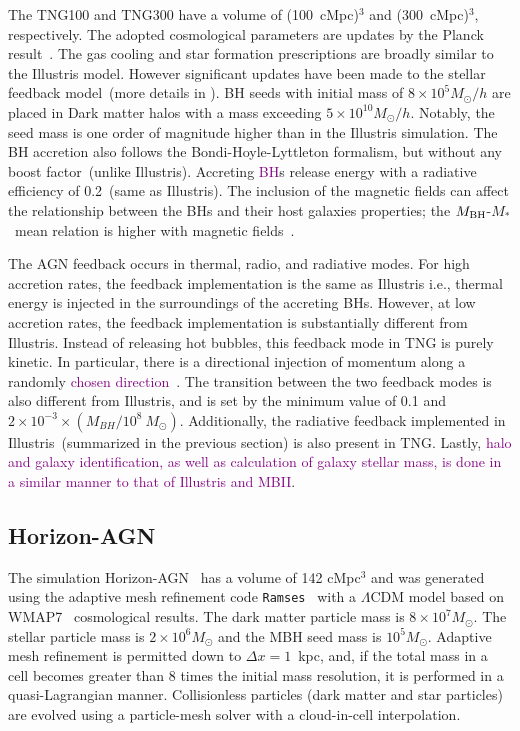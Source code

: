 \documentclass[twocolumn]{aastex631}
\newcommand{\red}[1]{\textcolor{purple}{#1}}
\def\smass{{$M_*$}}
\def\mbh{$M_{\rm BH}$}
\begin{document}
The TNG100 and TNG300 have a volume of (100~cMpc)$^3$ and (300~cMpc)$^3$, respectively. The adopted cosmological parameters are updates by the Planck result~\citep{2016A&A...594A..13P}.
The gas cooling and star formation prescriptions are broadly similar to the Illustris model. However significant updates have been made to the stellar feedback model~(more details in \citealt{2018MNRAS.473.4077P}).
BH seeds with initial mass of $8 \times 10^5 M_{\odot}/h$ are placed in Dark matter halos with a mass exceeding $5 \times 10^{10} M_{\odot}/h$. Notably, the seed mass is one order of magnitude higher than in the Illustris simulation. The BH accretion also follows the Bondi-Hoyle-Lyttleton formalism, but without any boost factor~(unlike Illustris). Accreting \red{BH}s release energy with a radiative efficiency of 0.2~(same as Illustris). The inclusion of the magnetic fields can affect the relationship between the BHs and their host galaxies properties; the \mbh-\smass\ mean relation is higher with magnetic fields~\citep{2018MNRAS.473.4077P}. 

The AGN feedback occurs in thermal, radio, and radiative modes. For high accretion rates, the feedback implementation is the same as Illustris i.e., thermal energy is injected in the surroundings of the accreting BHs. However, at low accretion rates, the feedback implementation is substantially different from Illustris. Instead of releasing hot bubbles, this feedback mode in TNG is purely kinetic. In particular, there is a directional injection of momentum along a randomly \red{chosen direction~\citep{2017MNRAS.465.3291W, 2018MNRAS.479.4056W}}. %
The transition between the two feedback modes is also different from Illustris, and is set by the minimum value of 0.1 and $2 \times 10 ^{-3} \times (M_{BH} / 10^8~M_{\odot})$. Additionally, the radiative feedback implemented in Illustris~(summarized in the previous section) is also present in TNG. Lastly, \red{halo and galaxy identification, as well as calculation of galaxy stellar mass, is done in a similar manner to that of Illustris and MBII}.

\subsection{Horizon-AGN}\label{subsec:Horizon}
The simulation Horizon-AGN~\citep{2014MNRAS.444.1453D, 2016MNRAS.463.3948D} has a volume of 142 cMpc$^3$ and was generated using the adaptive mesh refinement code {\tt Ramses}~\citep{2002A&A...385..337T} with a $\Lambda$CDM model based on WMAP7~\citep{2011ApJS..192...18K} cosmological results. The dark matter particle mass is $8\times 10^7 M_{\odot}$. The stellar particle mass is $2\times 10^6 M_{\odot}$ and the MBH seed mass is $10^5 M_{\odot}$. Adaptive mesh refinement is permitted down to $\Delta x=1$~kpc, and, if the total mass in a cell becomes greater than 8 times the initial mass resolution, it is performed in a quasi-Lagrangian manner. Collisionless particles (dark matter and star particles) are evolved using a particle-mesh solver with a cloud-in-cell interpolation.
\end{document}
